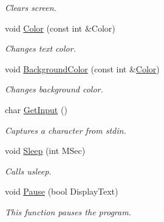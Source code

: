 \begin{DoxyCompactItemize}
\begin{DoxyCompactList}\small\item\em Clears screen. \end{DoxyCompactList}\item 
void \hyperlink{namespace_chase_game_a3a120300b1e200a26fe8680a33300283}{Color} (const int \&Color)
\begin{DoxyCompactList}\small\item\em Changes text color. \end{DoxyCompactList}\item 
void \hyperlink{namespace_chase_game_ad2dbfd93f4fd5725ab396d5dfa78a0c4}{Background\-Color} (const int \&\hyperlink{namespace_chase_game_a3a120300b1e200a26fe8680a33300283}{Color})
\begin{DoxyCompactList}\small\item\em Changes background color. \end{DoxyCompactList}\item 
char \hyperlink{namespace_chase_game_afa8eec677de5433e0e886da19f7e9c4a}{Get\-Input} ()
\begin{DoxyCompactList}\small\item\em Captures a character from stdin. \end{DoxyCompactList}\item 
void \hyperlink{namespace_chase_game_a8ca147721cdfaf96ee1f9c5007c27142}{Sleep} (int M\-Sec)
\begin{DoxyCompactList}\small\item\em Calls usleep. \end{DoxyCompactList}\item 
void \hyperlink{namespace_chase_game_a944f872ea6d98761b645f2b7d7cad8fa}{Pause} (bool Display\-Text)
\begin{DoxyCompactList}\small\item\em This function pauses the program. \end{DoxyCompactList}\end{DoxyCompactItemize}
